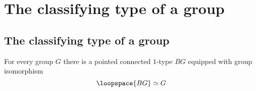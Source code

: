 \section{The classifying type of a group}

\subsection{The classifying type of a group}

\begin{thm}
  For every group $G$ there is a pointed connected $1$-type $BG$ equipped with group isomorphism
  \begin{equation*}
    \loopspace{BG} \simeq G
  \end{equation*}
\end{thm}
